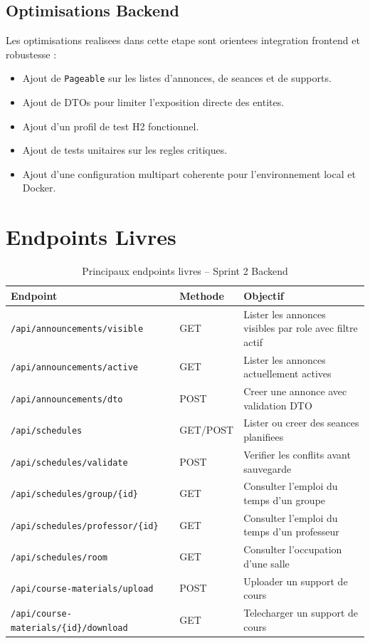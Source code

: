 \documentclass[12pt,a4paper]{report}
\begin{document}
\subsection{Optimisations Backend}

Les optimisations realisees dans cette etape sont orientees integration frontend et robustesse :

\begin{itemize}[itemsep=0.3em]
    \item Ajout de \texttt{Pageable} sur les listes d'annonces, de seances et de supports.
    \item Ajout de DTOs pour limiter l'exposition directe des entites.
    \item Ajout d'un profil de test H2 fonctionnel.
    \item Ajout de tests unitaires sur les regles critiques.
    \item Ajout d'une configuration multipart coherente pour l'environnement local et Docker.
\end{itemize}

\section{Endpoints Livres}

\begin{table}[H]
\centering
\caption{Principaux endpoints livres -- Sprint 2 Backend}
\begin{tabular}{|p{4.2cm}|p{3cm}|p{6.2cm}|}
\hline
\textbf{Endpoint} & \textbf{Methode} & \textbf{Objectif} \\
\hline
\texttt{/api/announcements/visible} & GET & Lister les annonces visibles par role avec filtre actif \\
\hline
\texttt{/api/announcements/active} & GET & Lister les annonces actuellement actives \\
\hline
\texttt{/api/announcements/dto} & POST & Creer une annonce avec validation DTO \\
\hline
\texttt{/api/schedules} & GET/POST & Lister ou creer des seances planifiees \\
\hline
\texttt{/api/schedules/validate} & POST & Verifier les conflits avant sauvegarde \\
\hline
\texttt{/api/schedules/group/\{id\}} & GET & Consulter l'emploi du temps d'un groupe \\
\hline
\texttt{/api/schedules/professor/\{id\}} & GET & Consulter l'emploi du temps d'un professeur \\
\hline
\texttt{/api/schedules/room} & GET & Consulter l'occupation d'une salle \\
\hline
\texttt{/api/course-materials/upload} & POST & Uploader un support de cours \\
\hline
\texttt{/api/course-materials/\{id\}/download} & GET & Telecharger un support de cours \\
\hline
\end{tabular}
\end{table}
\end{document}
